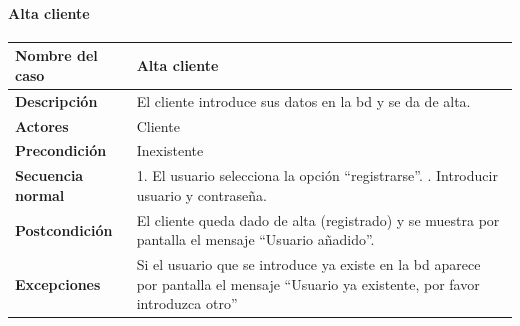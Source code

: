 \paragraph{Alta cliente}
\begin{table}[H]
    \centering
    \small
    \begin{tabularx}{0.8\textwidth}{|p{3.5cm}|X|}
        \hline
        \rowcolor{lightgray}
        \textbf{Nombre del caso}  & \textbf{Alta cliente}                                                                                                                       \\
        \hline
        \textbf{Descripción}      & El cliente introduce sus datos en la \gls{bd} y se da de alta.                                                                              \\
        \hline
        \textbf{Actores}          & Cliente                                                                                                                                     \\
        \hline
        \textbf{Precondición}     & Inexistente                                                                                                                                 \\
        \hline
        \textbf{Secuencia normal} & 1. El usuario selecciona la opción ``registrarse''. \newline
        2. Introducir usuario y contraseña.                                                                                                                                     \\
        \hline
        \textbf{Postcondición}    & El cliente queda dado de alta (registrado) y se muestra por pantalla el mensaje ``Usuario añadido''.                                        \\
        \hline
        \textbf{Excepciones}      & Si el usuario que se introduce ya existe en la \gls{bd} aparece por pantalla el mensaje ``Usuario ya existente, por favor introduzca otro'' \\
        \hline
    \end{tabularx}
\end{table}
